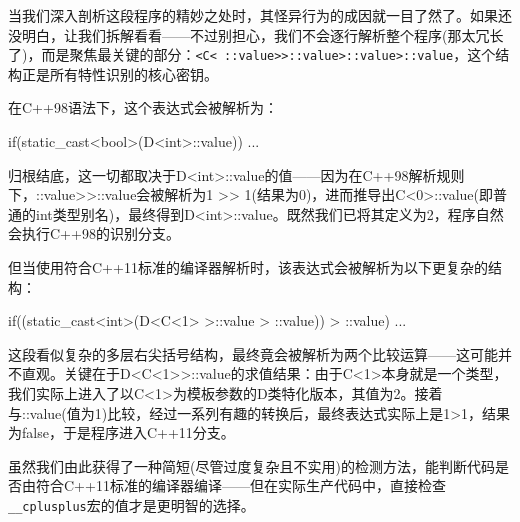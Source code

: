 当我们深入剖析这段程序的精妙之处时，其怪异行为的成因就一目了然了。如果还没明白，让我们拆解看看——不过别担心，我们不会逐行解析整个程序(那太冗长了)，而是聚焦最关键的部分：\verb|<C< ::value>>::value>::value>::value|，这个结构正是所有特性识别的核心密钥。

在C++98语法下，这个表达式会被解析为：

\begin{cpp}
if(static_cast<bool>(D<int>::value)) { ... }
\end{cpp}

归根结底，这一切都取决于D<int>::value的值——因为在C++98解析规则下，::value>{}>::value会被解析为1 >{}> 1(结果为0)，进而推导出C<0>::value(即普通的int类型别名)，最终得到D<int>::value。既然我们已将其定义为2，程序自然会执行C++98的识别分支。

但当使用符合C++11标准的编译器解析时，该表达式会被解析为以下更复杂的结构：

\begin{cpp}
if((static_cast<int>(D<C<1> >::value > ::value)) > ::value) { ... }
\end{cpp}

这段看似复杂的多层右尖括号结构，最终竟会被解析为两个比较运算——这可能并不直观。关键在于D<C<1>{}>::value的求值结果：由于C<1>本身就是一个类型，我们实际上进入了以C<1>为模板参数的D类特化版本，其值为2。接着与::value(值为1)比较，经过一系列有趣的转换后，最终表达式实际上是1>1，结果为false，于是程序进入C++11分支。

虽然我们由此获得了一种简短(尽管过度复杂且不实用)的检测方法，能判断代码是否由符合C++11标准的编译器编译——但在实际生产代码中，直接检查\verb|__cplusplus|宏的值才是更明智的选择。






